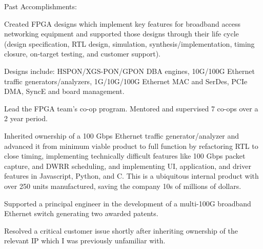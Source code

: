 \documentclass[1pt]{deedy-resume-reversed}
\begin{document}
\begin{minipage}[t]{1.0\textwidth}
Past Accomplishments:
\vspace{\topsep} %
\begin{tightemize}
\item Created FPGA designs which implement key features for broadband access networking equipment and
supported those designs through their life cycle (design specification, RTL design, simulation,
synthesis/implementation, timing closure, on-target testing, and customer support).
\item Designs include: HSPON/XGS-PON/GPON DBA engines, 10G/100G Ethernet traffic generators/analyzers,
1G/10G/100G Ethernet MAC and SerDes, PCIe DMA, SyncE and board management.
\item Lead the FPGA team's co-op program. Mentored and supervised 7 co-ops over a 2 year period.
\item Inherited ownership of a 100 Gbps Ethernet traffic generator/analyzer and advanced it from minimum viable product to full function by refactoring RTL to close timing,
implementing technically difficult features like 100 Gbps packet capture, and DWRR scheduling, and implementing UI, application,
and driver features in Javascript, Python, and C. This is a ubiquitous internal product with over 250 units manufactured, saving the company 10s of millions of dollars.
\item Supported a principal engineer in the development of a multi-100G broadband Ethernet switch generating two awarded patents.
\item Resolved a critical customer issue shortly after inheriting ownership of the relevant IP which I was previously unfamiliar with.

\end{tightemize}
\end{minipage}
\end{document}
